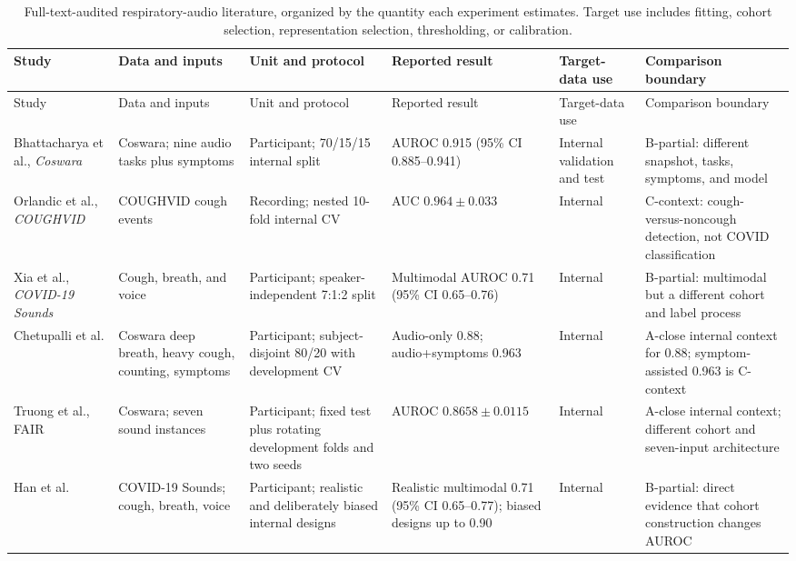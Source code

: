 \begingroup
\scriptsize
\setlength{\tabcolsep}{3pt}
\begin{longtable}{L{0.15\textwidth}L{0.14\textwidth}L{0.17\textwidth}L{0.12\textwidth}L{0.15\textwidth}L{0.17\textwidth}}
\caption{Full-text-audited respiratory-audio literature, organized by the
quantity each experiment estimates. Target use includes fitting, cohort
selection, representation selection, thresholding, or calibration.}
\label{tab:literature}\\
\toprule
Study & Data and inputs & Unit and protocol & Reported result & Target-data use & Comparison boundary \\
\midrule
\endfirsthead
\toprule
Study & Data and inputs & Unit and protocol & Reported result & Target-data use & Comparison boundary \\
\midrule
\endhead
Bhattacharya et al., \emph{Coswara} \cite{bhattacharya2023coswara} & Coswara; nine audio tasks plus symptoms & Participant; 70/15/15 internal split & AUROC 0.915 (95\% CI 0.885--0.941) & Internal validation and test & B-partial: different snapshot, tasks, symptoms, and model \\
Orlandic et al., \emph{COUGHVID} \cite{orlandic2021coughvid} & COUGHVID cough events & Recording; nested 10-fold internal CV & AUC $0.964\pm0.033$ & Internal & C-context: cough-versus-noncough detection, not COVID classification \\
Xia et al., \emph{COVID-19 Sounds} \cite{xia2021covid} & Cough, breath, and voice & Participant; speaker-independent 7:1:2 split & Multimodal AUROC 0.71 (95\% CI 0.65--0.76) & Internal & B-partial: multimodal but a different cohort and label process \\
Chetupalli et al. \cite{chetupalli2023multimodal} & Coswara deep breath, heavy cough, counting, symptoms & Participant; subject-disjoint 80/20 with development CV & Audio-only 0.88; audio+symptoms 0.963 & Internal & A-close internal context for 0.88; symptom-assisted 0.963 is C-context \\
Truong et al., FAIR \cite{truong2024fair} & Coswara; seven sound instances & Participant; fixed test plus rotating development folds and two seeds & AUROC $0.8658\pm0.0115$ & Internal & A-close internal context; different cohort and seven-input architecture \\
Han et al. \cite{han2022realistic} & COVID-19 Sounds; cough, breath, voice & Participant; realistic and deliberately biased internal designs & Realistic multimodal 0.71 (95\% CI 0.65--0.77); biased designs up to 0.90 & Internal & B-partial: direct evidence that cohort construction changes AUROC \\

\end{longtable}
